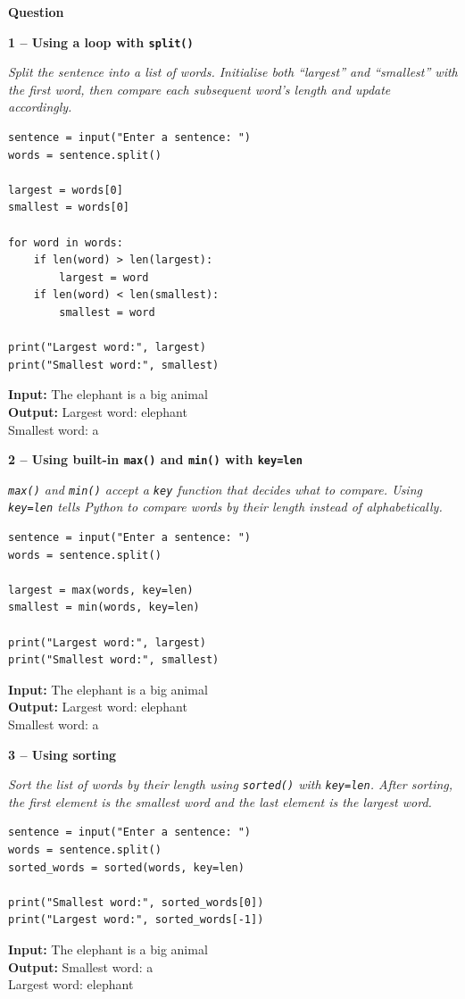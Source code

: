 \documentclass[12pt]{article}
\newenvironment{qbox}[1]{\par\bigskip\noindent\textbf{#1}\par}{\par\medskip}
\newcommand{\1}{Question}
\newcommand{\method}[1]{\par\medskip\noindent\textbf{#1}\par}
\newcommand{\logicbox}[1]{\par\smallskip\noindent\textit{#1}\par}
\newcommand{\inout}[2]{\par\smallskip\noindent\textbf{Input:} #1\\\textbf{Output:} #2\par}
\begin{document}
\begin{qbox}{\1}

\method{1 -- Using a loop with \texttt{split()}}
\logicbox{Split the sentence into a list of words. Initialise both ``largest'' and ``smallest'' with the first word, then compare each subsequent word's length and update accordingly.}
\begin{lstlisting}
sentence = input("Enter a sentence: ")
words = sentence.split()

largest = words[0]
smallest = words[0]

for word in words:
    if len(word) > len(largest):
        largest = word
    if len(word) < len(smallest):
        smallest = word

print("Largest word:", largest)
print("Smallest word:", smallest)
\end{lstlisting}
\inout{The elephant is a big animal}{Largest word: elephant\\Smallest word: a}

\method{2 -- Using built-in \texttt{max()} and \texttt{min()} with \texttt{key=len}}
\logicbox{\texttt{max()} and \texttt{min()} accept a \texttt{key} function that decides what to compare. Using \texttt{key=len} tells Python to compare words by their length instead of alphabetically.}
\begin{lstlisting}
sentence = input("Enter a sentence: ")
words = sentence.split()

largest = max(words, key=len)
smallest = min(words, key=len)

print("Largest word:", largest)
print("Smallest word:", smallest)
\end{lstlisting}
\inout{The elephant is a big animal}{Largest word: elephant\\Smallest word: a}

\method{3 -- Using sorting}
\logicbox{Sort the list of words by their length using \texttt{sorted()} with \texttt{key=len}. After sorting, the first element is the smallest word and the last element is the largest word.}
\begin{lstlisting}
sentence = input("Enter a sentence: ")
words = sentence.split()
sorted_words = sorted(words, key=len)

print("Smallest word:", sorted_words[0])
print("Largest word:", sorted_words[-1])
\end{lstlisting}
\inout{The elephant is a big animal}{Smallest word: a\\Largest word: elephant}
\end{qbox}
\end{document}

